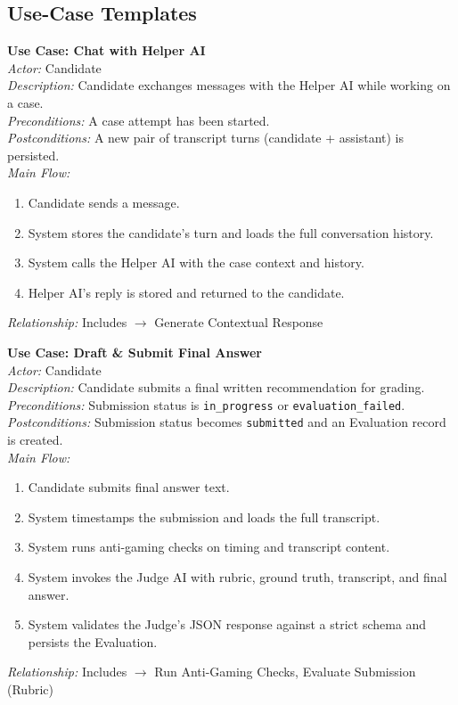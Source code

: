 \documentclass[12pt,a4paper]{report}
\begin{document}
\subsection{Use-Case Templates}

\textbf{Use Case: Chat with Helper AI}\\
\emph{Actor:} Candidate\\
\emph{Description:} Candidate exchanges messages with the Helper AI while working on a case.\\
\emph{Preconditions:} A case attempt has been started.\\
\emph{Postconditions:} A new pair of transcript turns (candidate + assistant) is persisted.\\
\emph{Main Flow:}
\begin{enumerate}[nosep]
    \item Candidate sends a message.
    \item System stores the candidate's turn and loads the full conversation history.
    \item System calls the Helper AI with the case context and history.
    \item Helper AI's reply is stored and returned to the candidate.
\end{enumerate}
\emph{Relationship:} Includes $\rightarrow$ Generate Contextual Response

\vspace{0.3cm}
\textbf{Use Case: Draft \& Submit Final Answer}\\
\emph{Actor:} Candidate\\
\emph{Description:} Candidate submits a final written recommendation for grading.\\
\emph{Preconditions:} Submission status is \texttt{in\_progress} or \texttt{evaluation\_failed}.\\
\emph{Postconditions:} Submission status becomes \texttt{submitted} and an Evaluation record is created.\\
\emph{Main Flow:}
\begin{enumerate}[nosep]
    \item Candidate submits final answer text.
    \item System timestamps the submission and loads the full transcript.
    \item System runs anti-gaming checks on timing and transcript content.
    \item System invokes the Judge AI with rubric, ground truth, transcript, and final answer.
    \item System validates the Judge's JSON response against a strict schema and persists the Evaluation.
\end{enumerate}
\emph{Relationship:} Includes $\rightarrow$ Run Anti-Gaming Checks, Evaluate Submission (Rubric)
\end{document}
